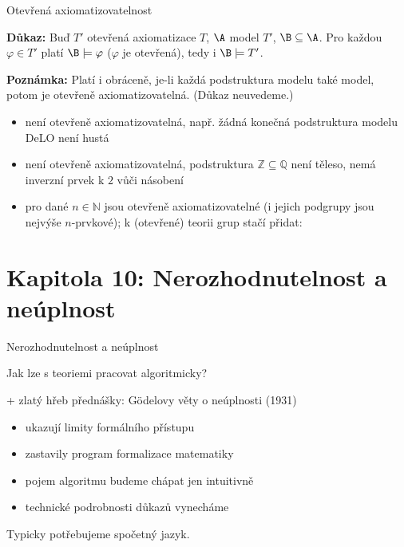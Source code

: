 \documentclass{beamer}
\begin{document}
\begin{frame}{Otevřená axiomatizovatelnost}

    \smallskip

    \pause
    
    \pause
    \textbf{Důkaz:}
    Buď $T'$ otevřená axiomatizace $T$, $\A$ model $T'$, $\B\subseteq\A$. Pro každou $\varphi\in T'$ platí $\B\models\varphi$ ($\varphi$ je otevřená), tedy i $\B\models T'$.  
    \hfill\qedsymbol

    \pause
    \textbf{Poznámka:} Platí i obráceně, je-li každá podstruktura modelu také model, potom je otevřeně axiomatizovatelná. (Důkaz neuvedeme.)

    \pause
    \begin{itemize}
        \item {} není otevřeně axiomatizovatelná, např. žádná konečná podstruktura modelu DeLO není hustá\pause
        \item {} není otevřeně axiomatizovatelná, podstruktura $\mathbb Z\subseteq\mathbb Q$ není těleso, nemá inverzní prvek k $2$ vůči násobení\pause
        \item pro dané $n\in\mathbb N$ jsou  otevřeně axiomatizovatelné (i jejich podgrupy jsou nejvýše $n$-prvkové); k (otevřené) teorii grup stačí přidat: 
    \end{itemize}

\end{frame}


\section{\sc Kapitola 10: Nerozhodnutelnost a neúplnost}


\begin{frame}{Nerozhodnutelnost a neúplnost}

    \pause
    Jak lze s teoriemi pracovat algoritmicky?

    \medskip

    \pause
    + zlatý hřeb přednášky: \alert{Gödelovy věty o neúplnosti} (1931)\pause
    \begin{itemize}
        \item ukazují limity formálního přístupu
        \item zastavily program formalizace matematiky
        \item pojem \alert{algoritmu} budeme chápat jen intuitivně
        \item technické podrobnosti důkazů vynecháme
        
    \end{itemize}

    \pause
    Typicky potřebujeme spočetný jazyk.
     
\end{frame}
\end{document}

